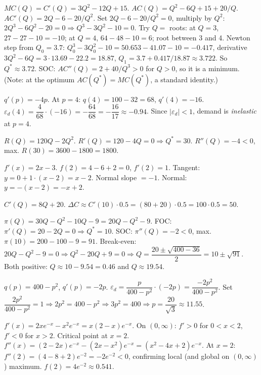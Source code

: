 \begin{solutions}
  \item $MC(Q)=C'(Q)=3Q^2-12Q+15$. $AC(Q)=Q^2-6Q+15+20/Q$.
        $AC'(Q)=2Q-6-20/Q^2$. Set $2Q-6-20/Q^2=0$, multiply by $Q^2$:
        $2Q^3-6Q^2-20=0\Rightarrow Q^3-3Q^2-10=0$. Try $Q=$ roots: at
        $Q=3$, $27-27-10=-10$; at $Q=4$, $64-48-10=6$; root between 3 and
        4. Newton step from $Q_0=3.7$: $Q_0^3-3Q_0^2-10
        =50.653-41.07-10=-0.417$, derivative $3Q^2-6Q=3\cdot13.69-22.2
        =18.87$, $Q_1=3.7+0.417/18.87\approx3.722$. So $Q^*\approx3.72$.
        SOC: $AC''(Q)=2+40/Q^3>0$ for $Q>0$, so it is a minimum. (Note: at
        the optimum $AC(Q^*)=MC(Q^*)$, a standard identity.)

  \item $q'(p)=-4p$. At $p=4$: $q(4)=100-32=68$, $q'(4)=-16$.
        $\varepsilon_d(4)=\dfrac{4}{68}\cdot(-16)=-\dfrac{64}{68}
        =-\dfrac{16}{17}\approx-0.94$. Since $|\varepsilon_d|<1$, demand
        is \emph{inelastic} at $p=4$.

  \item $R(Q)=120Q-2Q^2$. $R'(Q)=120-4Q=0\Rightarrow Q^*=30$.
        $R''(Q)=-4<0$, max. $R(30)=3600-1800=1800$.

  \item $f'(x)=2x-3$. $f(2)=4-6+2=0$, $f'(2)=1$. Tangent:
        $y=0+1\cdot(x-2)=x-2$. Normal slope $=-1$. Normal:
        $y=-(x-2)=-x+2$.

  \item $C'(Q)=8Q+20$. $\Delta C\approx C'(10)\cdot0.5
        =(80+20)\cdot0.5=100\cdot0.5=50$.

  \item $\pi(Q)=30Q-Q^2-10Q-9=20Q-Q^2-9$. FOC:
        $\pi'(Q)=20-2Q=0\Rightarrow Q^*=10$. SOC: $\pi''(Q)=-2<0$, max.
        $\pi(10)=200-100-9=91$. Break-even: $20Q-Q^2-9=0\Rightarrow
        Q^2-20Q+9=0\Rightarrow Q=\dfrac{20\pm\sqrt{400-36}}{2}
        =10\pm\sqrt{91}$. Both positive: $Q\approx10-9.54=0.46$ and
        $Q\approx19.54$.

  \item $q(p)=400-p^2$, $q'(p)=-2p$.
        $\varepsilon_d=\dfrac{p}{400-p^2}\cdot(-2p)=\dfrac{-2p^2}{400-p^2}$.
        Set $\dfrac{2p^2}{400-p^2}=1\Rightarrow2p^2=400-p^2
        \Rightarrow3p^2=400\Rightarrow p=\dfrac{20}{\sqrt3}\approx11.55$.

  \item $f'(x)=2xe^{-x}-x^2e^{-x}=x(2-x)e^{-x}$. On $(0,\infty)$:
        $f'>0$ for $0<x<2$, $f'<0$ for $x>2$. Critical point at $x=2$.
        $f''(x)=(2-2x)e^{-x}-(2x-x^2)e^{-x}=(x^2-4x+2)e^{-x}$. At $x=2$:
        $f''(2)=(4-8+2)e^{-2}=-2e^{-2}<0$, confirming local (and global on
        $(0,\infty)$) maximum. $f(2)=4e^{-2}\approx0.541$.


\end{solutions}

